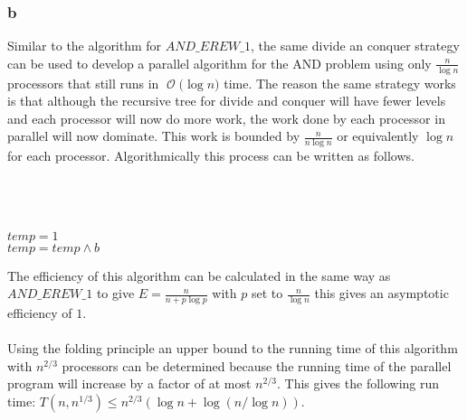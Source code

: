 \documentclass[12pt]{article}
\newcommand{\BigO}[1]{\ensuremath{\operatorname{\mathcal{O}}\bigl(#1\bigr)}}
\begin{document}
\subsubsection*{b}
Similar to the algorithm for $AND\_EREW\_1$, the same divide an conquer
strategy can be used to develop a parallel algorithm for the AND problem
using only $\frac{n}{\log n}$ processors that still runs in \BigO{\log n}
time.  The reason the same strategy works is that although the recursive
tree for divide and conquer will have fewer levels and each processor
will now do more work, the work done by each processor in parallel will
now dominate.  This work is bounded by $\frac{n}{n\log n}$ or
equivalently $\log n$ for each processor.  Algorithmically this process can be written
as follows.\\\\
\begin{algorithm}[H]
\\
\\
{$temp=1$\\
{$temp=temp\land b$}
}
\end{algorithm}
The efficiency of this algorithm can be calculated in the same way as
$AND\_EREW\_1$ to give $E=\frac{n}{n+p\log p}$ with $p$ set to $\frac{n}{\log n}$
this gives an asymptotic efficiency of $1$.\\\\
Using the folding principle an upper bound to the running time of this algorithm
with $n^{2/3}$ processors can be determined because the running time of the parallel
program will increase by a factor of at most $n^{2/3}$.  This gives the following 
run time: $T(n,n^{1/3})\leq n^{2/3}(\log n + \log(n/\log n))$.
\end{document}
